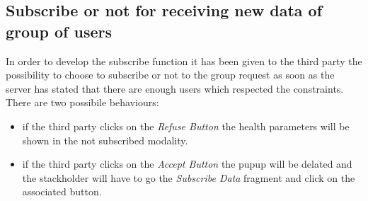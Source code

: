 \subsection{Subscribe or not for receiving new data of group of users}
In order to develop the subscribe function it has been given to the third party the possibility to choose to subscribe or not to the group request as soon as the server has stated that there are enough users which respected the constraints. \\
There are two possibile behaviours:
\begin{itemize}
	\item if the third party clicks on the\textit{ Refuse Button} the health parameters will be shown in the not subscribed modality.
	\item if the third party clicks on the \textit{Accept Button} the pupup will be delated and the stackholder will have to go the 			\textit{Subscribe Data} fragment and click on the associated button.
\end{itemize}


